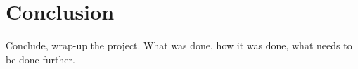 \section{Conclusion}\label{sec:conclusion}

Conclude, wrap-up the project. What was done, how it was done, what needs to be done further.